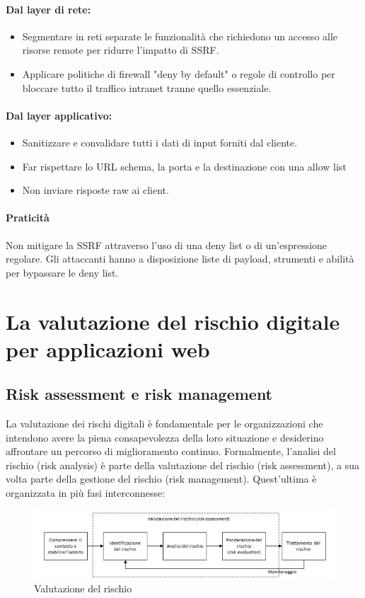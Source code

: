 \subsubsection{Dal layer di rete:}
\begin{itemize}
    \item Segmentare in reti separate le funzionalità che richiedono un accesso alle risorse remote per ridurre l'impatto di SSRF.
    \item Applicare politiche di firewall "deny by default" o regole di controllo per bloccare tutto il traffico intranet tranne quello essenziale.
\end{itemize}
\subsubsection{Dal layer applicativo:}
\begin{itemize}
    \item Sanitizzare e convalidare tutti i dati di input forniti dal cliente.
    \item Far rispettare lo URL schema, la porta e la destinazione con una allow list
    \item Non inviare risposte raw ai client.
\end{itemize}
\subsubsection{Praticità}
Non mitigare la SSRF attraverso l'uso di una deny list o di un'espressione regolare. Gli attaccanti hanno a disposizione liste di payload, strumenti e abilità per bypassare le deny list.


\chapter{La valutazione del rischio digitale per applicazioni web}
\section{Risk assessment e risk management }
La valutazione dei rischi digitali è fondamentale per le organizzazioni che intendono
avere la piena consapevolezza della loro situazione e desiderino affrontare un percorso
di miglioramento continuo. Formalmente, l’analisi del rischio (risk analysis) è parte della
valutazione del rischio (risk assessment), a sua volta parte della gestione del rischio
(risk management). Quest’ultima è organizzata in più fasi interconnesse: 
\begin{figure}[H]
    \centering
    \includegraphics[scale=0.9]{Immagini/img6.png}
    \caption{Valutazione del rischio}
    \label{fig:ValutazioneRischio}
\end{figure}

